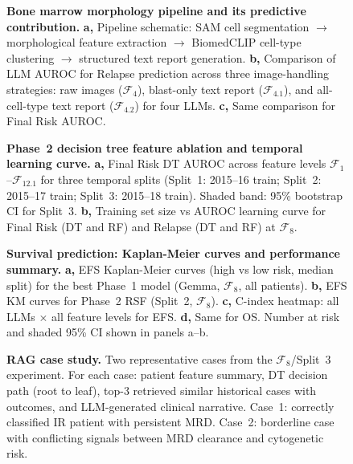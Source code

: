 \documentclass[pdflatex,sn-nature]{sn-jnl}
\begin{document}
\begin{figure}[ht]
\caption{\textbf{Bone marrow morphology pipeline and its predictive
contribution.}
\textbf{a,} Pipeline schematic: SAM cell segmentation $\rightarrow$
morphological feature extraction $\rightarrow$ BiomedCLIP cell-type
clustering $\rightarrow$ structured text report generation.
\textbf{b,} Comparison of LLM AUROC for Relapse prediction across
three image-handling strategies: raw images ($\mathcal{F}_4$),
blast-only text report ($\mathcal{F}_{4.1}$), and all-cell-type text
report ($\mathcal{F}_{4.2}$) for four LLMs.
\textbf{c,} Same comparison for Final Risk AUROC.}
\label{fig:morph}
\end{figure}

\begin{figure}[ht]
\caption{\textbf{Phase~2 decision tree feature ablation and temporal
learning curve.}
\textbf{a,} Final Risk DT AUROC across feature levels
$\mathcal{F}_1$--$\mathcal{F}_{12.1}$ for three temporal splits
(Split~1: 2015--16 train; Split~2: 2015--17 train; Split~3: 2015--18
train). Shaded band: 95\% bootstrap CI for Split~3.
\textbf{b,} Training set size vs AUROC learning curve for Final Risk
(DT and RF) and Relapse (DT and RF) at $\mathcal{F}_8$.}
\label{fig:p2ablation}
\end{figure}

\begin{figure}[ht]
\caption{\textbf{Survival prediction: Kaplan-Meier curves and
performance summary.}
\textbf{a,} EFS Kaplan-Meier curves (high vs low risk, median split)
for the best Phase~1 model (Gemma, $\mathcal{F}_8$, all patients).
\textbf{b,} EFS KM curves for Phase~2 RSF (Split~2, $\mathcal{F}_8$).
\textbf{c,} C-index heatmap: all LLMs $\times$ all feature levels for
EFS.
\textbf{d,} Same for OS.
Number at risk and shaded 95\% CI shown in panels a--b.}
\label{fig:km}
\end{figure}

\begin{figure}[ht]
\caption{\textbf{RAG case study.}
Two representative cases from the $\mathcal{F}_8$/Split~3 experiment.
For each case: patient feature summary, DT decision path (root to
leaf), top-3 retrieved similar historical cases with outcomes, and
LLM-generated clinical narrative.
Case~1: correctly classified IR patient with persistent MRD.
Case~2: borderline case with conflicting signals between MRD
clearance and cytogenetic risk.}
\label{fig:rag}
\end{figure}
\end{document}
